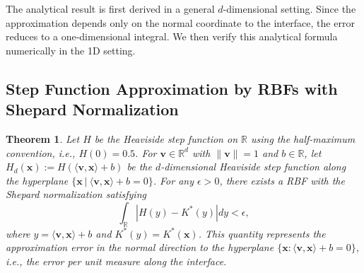\documentclass[final,1p,times]{elsarticle}
\theoremstyle{plain}
\newtheorem{theorem}{Theorem}
\theoremstyle{definition}
\theoremstyle{remark}
\newcommand{\bx}{\mathbf{x}}
\newcommand{\bv}{\mathbf{v}}
\begin{document}
The analytical result is first derived in a general $d$-dimensional setting. Since the approximation depends only on the normal coordinate to the interface, the error reduces to a one-dimensional integral. We then verify this analytical formula numerically in the 1D setting.


\subsection{Step Function Approximation by RBFs with Shepard Normalization}

\begin{theorem}
    Let $H$ be the Heaviside step function on $\mathbb{R}$ using the half-maximum convention, i.e., $H(0) = 0.5$.
    For $\bv \in \mathbb{R}^d$ with $\|\bv\|=1$ and $b \in \mathbb{R}$, 
    let $H_d(\bx):= H(\langle \bv,\bx \rangle + b)$ be the $d$-dimensional Heaviside step function along the hyperplane $\{\bx \ | \ \langle \bv,\bx\rangle + b=0\}$.
    For any $\epsilon>0$, there exists a RBF with the Shepard normalization satisfying
    $$
    \int_{\mathbb R}|H(y)-K^*(y)|dy<\epsilon,
    $$
    where $y=\langle\bv,\bx\rangle+b$ and
$K^*(y)=K^*(\bx)$. This quantity represents the approximation error in the normal direction to the hyperplane $\{\bx:\langle\bv,\bx\rangle+b=0\}$, i.e., the error per unit measure along the interface.

    

\end{theorem}
\end{document}
